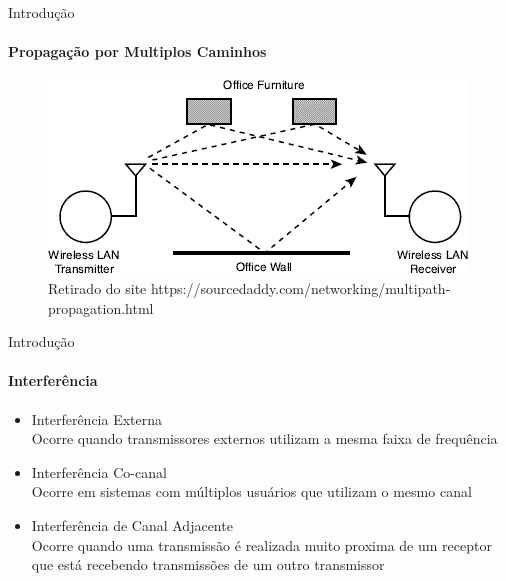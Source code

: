 \documentclass[c]{beamer}
\begin{document}
\begin{darkframes}
  \begin{frame}{Introdução}
    \framesubtitle{Propagação por Multiplos Caminhos}
    \begin{figure}[ht]
      \centering
      \includegraphics[width=\textwidth]{resources/multipath.png}\\
      \footnotesize{Retirado do site https://sourcedaddy.com/networking/multipath-propagation.html}
    \end{figure}
  \end{frame}

  \begin{frame}{Introdução}
    \framesubtitle{Interferência}
    \begin{itemize}
      \item \alert{Interferência Externa}             \\ Ocorre quando transmissores externos utilizam a mesma faixa de frequência
      \item \alert{Interferência Co-canal}            \\ Ocorre em sistemas com múltiplos usuários que utilizam o mesmo canal
      \item \alert{Interferência de Canal Adjacente}  \\ Ocorre quando uma transmissão é realizada muito proxima de um receptor que está recebendo transmissões de um outro transmissor
    \end{itemize}
  \end{frame}


\end{darkframes}
\end{document}
